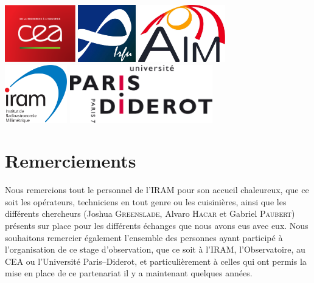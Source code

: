 \documentclass[a4paper,10pt,french]{article}
\begin{document}
\begin{center}
    \vspace{0.5cm}

    \hfill \includegraphics[height=2.5cm]{logo_cea.pdf} \hfill \includegraphics[height=2.5cm]{logo_irfu.png} \hfill \includegraphics[height=2.5cm]{logo_aim.jpg} \hfill \null \\
    \vspace{0.5cm}
    \hfill \includegraphics[height=2.5cm]{logo_iram.png} \hfill \includegraphics[height=2.5cm]{logo_upd.png} \hfill \null \\

\end{center}

\vfill
\hfill \thedate

\newpage

\thispagestyle{empty}

\section*{Remerciements}

Nous remercions tout le personnel de l’IRAM pour son accueil chaleureux, que ce
soit les opérateurs, techniciens en tout genre ou les cuisinières, ainsi que
les différents chercheurs (Joshua \textsc{Greenslade}, Alvaro \textsc{Hacar} et
Gabriel \textsc{Paubert}) présents sur place pour les différents échanges que
nous avons eus avec eux. Nous souhaitons remercier également l’ensemble des
personnes ayant participé à l’organisation de ce stage d’observation, que ce
soit à l’IRAM, l’Observatoire, au CEA ou l’Université Paris–Diderot, et
particulièrement à celles qui ont permis la mise en place de ce partenariat il
y a maintenant quelques années.
\end{document}
